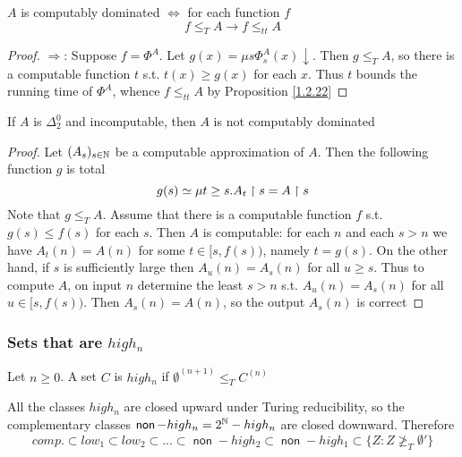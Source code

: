 \documentclass[11pt]{article}
\DeclareMathOperator{\non}{\textsf{non}}
\begin{document}
\begin{proposition}[]
\(A\) is computably dominated \(\Leftrightarrow\) for each function \(f\)
\begin{equation*}
f\le_TA\to f\le_{tt}A
\end{equation*}
\end{proposition}

\begin{proof}
\(\Rightarrow\): Suppose \(f=\Phi^A\). Let \(g(x)=\mu s\Phi_s^A(x)\downarrow\). Then \(g\le_TA\), so there is a computable
function \(t\) s.t. \(t(x)\ge g(x)\) for each \(x\). Thus \(t\) bounds the running time of \(\Phi^A\),
whence \(f\le_{tt}A\) by Proposition \ref{1.2.22}
\end{proof}

\begin{proposition}[]
If \(A\) is \(\Delta_2^0\) and incomputable, then \(A\) is not computably dominated
\end{proposition}

\begin{proof}
Let \((A_s)_{s\in\mathbb{N}}\) be a computable approximation of \(A\). Then the following function \(g\) is
total
\begin{equation*}
g(s)\simeq\mu t\ge s.A_t\upharpoonright s=A\upharpoonright s
\end{equation*}
Note that \(g\le_TA\). Assume that there is a computable function \(f\) s.t. \(g(s)\le f(s)\) for
each \(s\). Then \(A\) is computable: for each \(n\) and each \(s>n\) we have \(A_t(n)=A(n)\)
for some \(t\in[s,f(s))\), namely \(t=g(s)\). On the other hand, if \(s\) is sufficiently large
then \(A_u(n)=A_s(n)\) for all \(u\ge s\). Thus to compute \(A\), on input \(n\) determine the
least \(s>n\) s.t. \(A_u(n)=A_s(n)\) for all \(u\in[s,f(s))\). Then \(A_s(n)=A(n)\), so the
output \(A_s(n)\) is correct
\end{proof}
\subsubsection{Sets that are \texorpdfstring{\(high_n\)}{highn}}
\label{sec:org2c27c16}
\begin{definition}[]
Let \(n\ge 0\). A set \(C\) is \(high_n\) if \(\emptyset^{(n+1)}\le_TC^{(n)}\)
\end{definition}

All the classes \(high_n\) are closed upward under Turing reducibility, so the complementary
classes \(\non-high_n=2^{\N}-high_n\) are closed downward. Therefore
\begin{equation*}
comp.\subset low_1\subset low_2\subset\dots\subset\non-high_2\subset\non-high_1\subset\{Z:Z\not\ge_T\emptyset'\}
\end{equation*}
\end{document}
